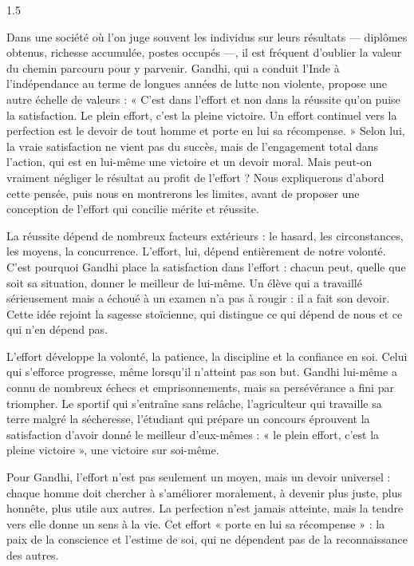 \documentclass[12pt]{article}
\begin{document}
\begin{spacing}{1.5}


Dans une société où l'on juge souvent les individus sur leurs résultats — diplômes obtenus, richesse accumulée, postes occupés —, il est fréquent d'oublier la valeur du chemin parcouru pour y parvenir. Gandhi, qui a conduit l'Inde à l'indépendance au terme de longues années de lutte non violente, propose une autre échelle de valeurs : « C'est dans l'effort et non dans la réussite qu'on puise la satisfaction. Le plein effort, c'est la pleine victoire. Un effort continuel vers la perfection est le devoir de tout homme et porte en lui sa récompense. » Selon lui, la vraie satisfaction ne vient pas du succès, mais de l'engagement total dans l'action, qui est en lui-même une victoire et un devoir moral. Mais peut-on vraiment négliger le résultat au profit de l'effort ? Nous expliquerons d'abord cette pensée, puis nous en montrerons les limites, avant de proposer une conception de l'effort qui concilie mérite et réussite.


La réussite dépend de nombreux facteurs extérieurs : le hasard, les circonstances, les moyens, la concurrence. L'effort, lui, dépend entièrement de notre volonté. C'est pourquoi Gandhi place la satisfaction dans l'effort : chacun peut, quelle que soit sa situation, donner le meilleur de lui-même. Un élève qui a travaillé sérieusement mais a échoué à un examen n'a pas à rougir : il a fait son devoir. Cette idée rejoint la sagesse stoïcienne, qui distingue ce qui dépend de nous et ce qui n'en dépend pas.

L'effort développe la volonté, la patience, la discipline et la confiance en soi. Celui qui s'efforce progresse, même lorsqu'il n'atteint pas son but. Gandhi lui-même a connu de nombreux échecs et emprisonnements, mais sa persévérance a fini par triompher. Le sportif qui s'entraîne sans relâche, l'agriculteur qui travaille sa terre malgré la sécheresse, l'étudiant qui prépare un concours éprouvent la satisfaction d'avoir donné le meilleur d'eux-mêmes : « le plein effort, c'est la pleine victoire », une victoire sur soi-même.

Pour Gandhi, l'effort n'est pas seulement un moyen, mais un devoir universel : chaque homme doit chercher à s'améliorer moralement, à devenir plus juste, plus honnête, plus utile aux autres. La perfection n'est jamais atteinte, mais la tendre vers elle donne un sens à la vie. Cet effort « porte en lui sa récompense » : la paix de la conscience et l'estime de soi, qui ne dépendent pas de la reconnaissance des autres.


\end{spacing}
\end{document}
